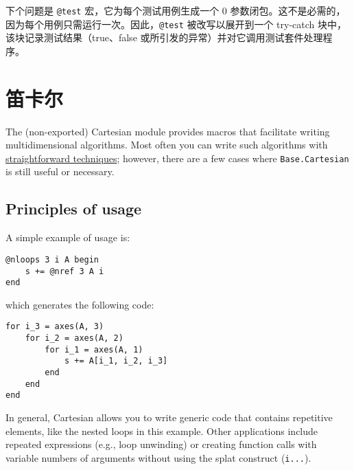 下个问题是 \texttt{@test} 宏，它为每个测试用例生成一个 0 参数闭包。这不是必需的，因为每个用例只需运行一次。因此，\texttt{@test} 被改写以展开到一个 try-catch 块中，该块记录测试结果（true、false 或所引发的异常）并对它调用测试套件处理程序。



\hypertarget{3626588894035984514}{}


\section{笛卡尔}



The (non-exported) Cartesian module provides macros that facilitate writing multidimensional algorithms. Most often you can write such algorithms with \href{https://julialang.org/blog/2016/02/iteration}{straightforward techniques}; however, there are a few cases where \texttt{Base.Cartesian} is still useful or necessary.



\hypertarget{10560451956896766301}{}


\subsection{Principles of usage}



A simple example of usage is:




\begin{verbatim}
@nloops 3 i A begin
    s += @nref 3 A i
end
\end{verbatim}



which generates the following code:




\begin{verbatim}
for i_3 = axes(A, 3)
    for i_2 = axes(A, 2)
        for i_1 = axes(A, 1)
            s += A[i_1, i_2, i_3]
        end
    end
end
\end{verbatim}



In general, Cartesian allows you to write generic code that contains repetitive elements, like the nested loops in this example.  Other applications include repeated expressions (e.g., loop unwinding) or creating function calls with variable numbers of arguments without using the {\textquotedbl}splat{\textquotedbl} construct (\texttt{i...}).



